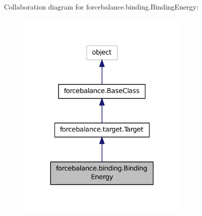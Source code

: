 Collaboration diagram for forcebalance.\-binding.\-Binding\-Energy\-:
\nopagebreak
\begin{figure}[H]
\begin{center}
\leavevmode
\includegraphics[width=234pt]{classforcebalance_1_1binding_1_1BindingEnergy__coll__graph}
\end{center}
\end{figure}
